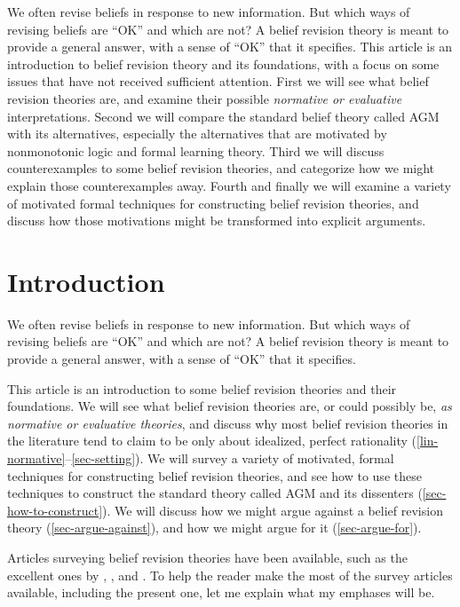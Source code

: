 We often revise beliefs in response to new information. But which ways of revising beliefs are ``OK'' and which are not? A belief revision theory is meant to provide a general answer, with a sense of ``OK'' that it specifies. This article is an introduction to belief revision theory and its foundations, with a focus on some issues that have not received sufficient attention. First we will see what belief revision theories are, and examine their possible {\em normative or evaluative} interpretations. Second we will compare the standard belief theory called AGM with its alternatives, especially the alternatives that are motivated by nonmonotonic logic and formal learning theory. Third we will discuss counterexamples to some belief revision theories, and categorize how we might explain those counterexamples away. Fourth and finally we will examine a variety of motivated formal techniques for constructing belief revision theories, and discuss how those motivations might be transformed into explicit arguments.


\section{Introduction}\label{lin-intro}

We often revise beliefs in response to new information. But which ways of revising beliefs are ``OK'' and which are not? A belief revision theory is meant to provide a general answer, with a sense of ``OK'' that it specifies.

This article is an introduction to some belief revision theories and their foundations. We will see what belief revision theories are, or could possibly be, {\em as normative or evaluative theories}, and discuss why most belief revision theories in the literature tend to claim to be only about idealized, perfect rationality (\autoref{lin-normative}--\autoref{sec-setting}). We will survey a variety of motivated, formal techniques for constructing belief revision theories, and see how to use these techniques to construct the standard theory called AGM and its dissenters (\autoref{sec-how-to-construct}). We will discuss how we might argue against a belief revision theory (\autoref{sec-argue-against}), and how we might argue for it (\autoref{sec-argue-for}). 

Articles surveying belief revision theories have been available, such as the excellent ones by \citet{sep-logic-belief-revision}, \citet*{rodrigues2011belief}, and \citet{huber2013belief-i,huber2013belief-ii}. To help the reader make the most of the survey articles available, including the present one, let me explain what my emphases will be. \op

